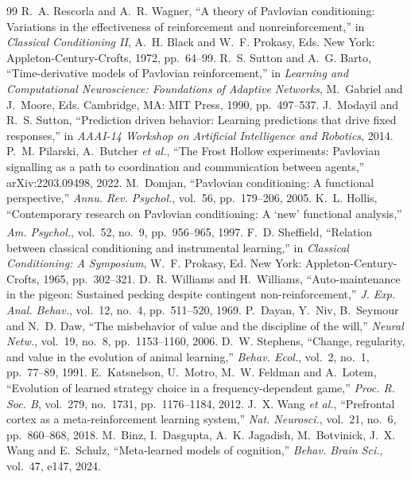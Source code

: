 \documentclass[conference]{IEEEtran}
\newcommand{\unv}{\textsuperscript{\dag}}
\begin{document}
\begin{thebibliography}{99}
\footnotesize
{} R.~A. Rescorla and A.~R. Wagner, ``A theory of Pavlovian conditioning: Variations in the effectiveness of reinforcement and nonreinforcement,'' in \textit{Classical Conditioning II}, A.~H. Black and W.~F. Prokasy, Eds. New York: Appleton-Century-Crofts, 1972, pp.~64--99.
 R.~S. Sutton and A.~G. Barto, ``Time-derivative models of Pavlovian reinforcement,'' in \textit{Learning and Computational Neuroscience: Foundations of Adaptive Networks}, M.~Gabriel and J.~Moore, Eds. Cambridge, MA: MIT Press, 1990, pp.~497--537.
 J.~Modayil and R.~S. Sutton, ``Prediction driven behavior: Learning predictions that drive fixed responses,'' in \textit{AAAI-14 Workshop on Artificial Intelligence and Robotics}, 2014.
 P.~M. Pilarski, A.~Butcher \textit{et al.}, ``The Frost Hollow experiments: Pavlovian signalling as a path to coordination and communication between agents,'' arXiv:2203.09498, 2022.
 M.~Domjan, ``Pavlovian conditioning: A functional perspective,'' \textit{Annu. Rev. Psychol.}, vol.~56, pp.~179--206, 2005.
 K.~L. Hollis, ``Contemporary research on Pavlovian conditioning: A `new' functional analysis,'' \textit{Am. Psychol.}, vol.~52, no.~9, pp.~956--965, 1997.\unv
{} F.~D. Sheffield, ``Relation between classical conditioning and instrumental learning,'' in \textit{Classical Conditioning: A Symposium}, W.~F. Prokasy, Ed. New York: Appleton-Century-Crofts, 1965, pp.~302--321.
 D.~R. Williams and H.~Williams, ``Auto-maintenance in the pigeon: Sustained pecking despite contingent non-reinforcement,'' \textit{J. Exp. Anal. Behav.}, vol.~12, no.~4, pp.~511--520, 1969.
 P.~Dayan, Y.~Niv, B.~Seymour and N.~D. Daw, ``The misbehavior of value and the discipline of the will,'' \textit{Neural Netw.}, vol.~19, no.~8, pp.~1153--1160, 2006.
 D.~W. Stephens, ``Change, regularity, and value in the evolution of animal learning,'' \textit{Behav. Ecol.}, vol.~2, no.~1, pp.~77--89, 1991.
 E.~Katsnelson, U.~Motro, M.~W. Feldman and A.~Lotem, ``Evolution of learned strategy choice in a frequency-dependent game,'' \textit{Proc. R. Soc. B}, vol.~279, no.~1731, pp.~1176--1184, 2012.
 J.~X. Wang \textit{et al.}, ``Prefrontal cortex as a meta-reinforcement learning system,'' \textit{Nat. Neurosci.}, vol.~21, no.~6, pp.~860--868, 2018.
 M.~Binz, I.~Dasgupta, A.~K. Jagadish, M.~Botvinick, J.~X. Wang and E.~Schulz, ``Meta-learned models of cognition,'' \textit{Behav. Brain Sci.}, vol.~47, e147, 2024.

\end{thebibliography}
\end{document}
